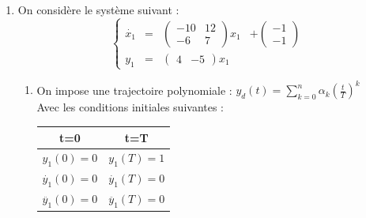 \documentclass[../main.tex]{subfiles}
\begin{document}
\begin{enumerate}
\begin{enumerate}
\begin{align*}
\intertext{puis,}
(p\mathbf{1_n}-A)^{-1} &= \frac{1}{(p+1)(p+2)(p+10)}\begin{pmatrix}
(p+2)(p+10) & 0 & 0\\
0 & (p+1)(p+10) & 0\\
2(p+2) & -2(p+1) & (p+1)(p+2)
\end{pmatrix}^T
\intertext{ensuite,}
C(p\mathbf{1_n}-A)^{-1} &= \frac{1}{(p+1)(p+2)(p+10)} \begin{pmatrix}
(p+2)(p+10) & 2(p+1)(p+10) & 2(p+2)-4(p+1)
\end{pmatrix}
\intertext{enfin on obtient l'ordre 2 :}
C(p\mathbf{1_n}-A)^{-1}B &= G(p) = \frac{p}{(p+1)(p+10)}
\end{align*}
Remarque :
\begin{align*}
G(p) &= G_1(p) G_2(p)
\intertext{avec}
G_1(p) &= C_1(p\mathbf{1_2}-A_1)B_1 = \frac{p}{(p+1)(p+2)}\\
G_2(p) &= C_2(p\mathbf{1_1}-A_2)B_2 + D_2 = \frac{p+2}{p+10}
\end{align*}
Un pôle de $G_1$ a été neutralisé par un zéro de $G_2$, on a donc une perte de commandabilité.\\
Réalisation minimale : un vecteur d'état de taille la plus petite. Ici, ordre 2 (on avait un ordre 3 qui n'était pas minimal).
\end{enumerate}
\item On considère le système suivant :\\
\[\left \{ \begin{matrix}
\dot{x_1} &= &\begin{pmatrix}-10&12\\-6&7\end{pmatrix} x_1 &+ \begin{pmatrix}-1\\-1\end{pmatrix}\\
y_1 &= &\begin{pmatrix}4&-5\end{pmatrix}x_1
\end{matrix} \right.\]
\begin{enumerate}

\item On impose une trajectoire polynomiale : $y_d(t) = \sum_{k=0}^n \alpha_k \left(\frac{t}{T}\right)^k$\\
Avec les conditions initiales suivantes :\\ \smallbreak
\begin{center}
\begin{tabular}{|c|c|}
\hline
t=0 & t=T \\
\hline
\hline
$y_1(0)=0$ & $y_1(T)=1$ \\
\hline
$\dot{y_1}(0)=0$ & $\dot{y_1}(T)=0$ \\
\hline
$\ddot{y_1}(0)=0$ & $\ddot{y_1}(T)=0$ \\
\hline
\end{tabular}
\end{center}


\end{enumerate}
\end{enumerate}
\end{document}
